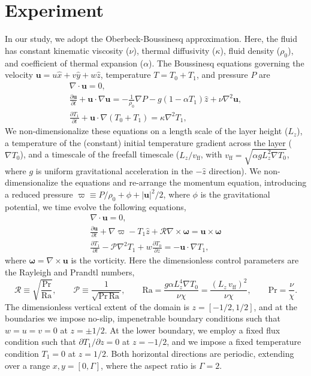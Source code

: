 \documentclass[aps, pre, onecolumn, nofootinbib, notitlepage, groupedaddress, amsfonts, amssymb, amsmath, longbibliography]{revtex4-1}
\newcommand{\DivU}{\ensuremath{\nabla\cdot\bm{u}}}
\newcommand{\grad}{\ensuremath{\nabla}}
\begin{document}
\section{Experiment}
\label{sec:experiment}
In our study, we adopt the Oberbeck-Boussinesq approximation.  Here, the
fluid has constant kinematic viscosity ($\nu$), thermal diffusivity ($\kappa$), fluid density ($\rho_0$), and coefficient
of thermal expansion ($\alpha$).   The Boussinesq
equations governing the velocity $\bm{u} = u\hat{x} + v\hat{y} + w\hat{z}$, temperature
$T = T_0 + T_1$, and pressure $P$ are \cite{spiegel&veronis1960}
\begin{gather}
\DivU = 0, 
	\label{eqn:dim_incompressible}
\\
\frac{\partial \bm{u}}{\partial t} + \bm{u}\cdot\grad\bm{u} =
-\frac{1}{\rho_0}\grad P - g( 1 - \alpha T_1)\hat{z} + \nu\grad^2\bm{u}, 
	\label{eqn:dim_bouss_momentum}
\\
\frac{\partial T_1}{\partial t} + \bm{u}\cdot\grad(T_0 + T_1) = \kappa\grad^2 T_1,
	\label{eqn:dim_bouss_energy}
\end{gather}
We non-dimensionalize these equations on a length scale of the layer height ($L_z$),
a temperature of the (constant) initial temperature gradient across the layer ($\grad T_0$), and a timescale
of the freefall timescale ($L_z / v_{\text{ff}}$, with $v_{\text{ff}} = \sqrt{\alpha g L_z^2 \grad T_0}$, where $g$ is 
uniform gravitational acceleration in the $-\hat{z}$ direction).
We non-dimensionalize the equations and re-arrange the momentum equation, introducing a reduced pressure
$\varpi \equiv P / \rho_0 + \phi + |\bm{u}|^2 / 2$, where $\phi$ is the gravitational potential, we time evolve
the following equations,
\begin{gather}
\DivU = 0, 
	\label{eqn:incompressible}
\\
\frac{\partial \bm{u}}{\partial t} + \grad \varpi - T_1\hat{z} + \mathcal{R}\grad\times\bm{\omega} = \bm{u}\times\bm{\omega}
	\label{eqn:bouss_momentum}
\\
\frac{\partial T_1}{\partial t} - \mathcal{P}\grad^2 T_1 + w \frac{\partial T_0}{\partial z} = - \bm{u}\cdot\grad T_1,
	\label{eqn:bouss_energy}
\end{gather}
where $\bm{\omega} = \grad \times \bm{u}$ is the vorticity.  
Here the dimensionless control parameters are the Rayleigh and Prandtl numbers,
\begin{equation}
\mathcal{R} \equiv \sqrt{\frac{\text{Pr}}{\text{Ra}}}, \qquad \mathcal{P} \equiv \frac{1}{\sqrt{\text{Pr}\,\text{Ra}}}, \qquad
\text{Ra} = \frac{g \alpha L_z^4 \grad T_0}{\nu\chi} = \frac{(L_z\,v_{\text{ff}})^2}{\nu\chi}, \qquad \text{Pr} = \frac{\nu}{\chi}.
\end{equation}
The dimensionless vertical extent of the domain is $z = [-1/2, 1/2]$, and at the boundaries
we impose no-slip, impenetrable boundary conditions such that $w = u = v = 0$ at $z = \pm 1/2$.
At the lower boundary, we employ a fixed flux condition such that $\partial T_1 / \partial z = 0$
at $z = -1/2$, and we impose a fixed temperature condition $T_1 = 0$ at $z = 1/2$. Both
horizontal directions are periodic, extending over a range $x, y = [0, \Gamma]$, where
the aspect ratio is $\Gamma = 2$.
\end{document}
